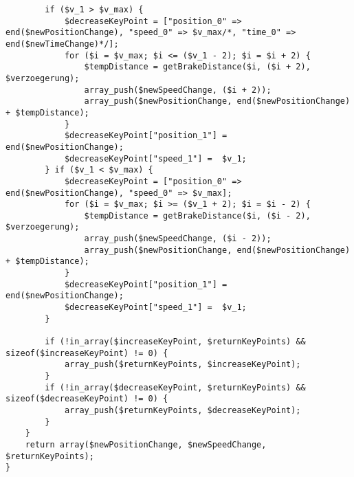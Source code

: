 \begin{lstlisting}
		if ($v_1 > $v_max) {
			$decreaseKeyPoint = ["position_0" => end($newPositionChange), "speed_0" => $v_max/*, "time_0" => end($newTimeChange)*/];
			for ($i = $v_max; $i <= ($v_1 - 2); $i = $i + 2) {
				$tempDistance = getBrakeDistance($i, ($i + 2), $verzoegerung);
				array_push($newSpeedChange, ($i + 2));
				array_push($newPositionChange, end($newPositionChange) + $tempDistance);
			}
			$decreaseKeyPoint["position_1"] =  end($newPositionChange);
			$decreaseKeyPoint["speed_1"] =  $v_1;
		} if ($v_1 < $v_max) {
			$decreaseKeyPoint = ["position_0" => end($newPositionChange), "speed_0" => $v_max];
			for ($i = $v_max; $i >= ($v_1 + 2); $i = $i - 2) {
				$tempDistance = getBrakeDistance($i, ($i - 2), $verzoegerung);
				array_push($newSpeedChange, ($i - 2));
				array_push($newPositionChange, end($newPositionChange) + $tempDistance);
			}
			$decreaseKeyPoint["position_1"] =  end($newPositionChange);
			$decreaseKeyPoint["speed_1"] =  $v_1;
		}

		if (!in_array($increaseKeyPoint, $returnKeyPoints) && sizeof($increaseKeyPoint) != 0) {
			array_push($returnKeyPoints, $increaseKeyPoint);
		}
		if (!in_array($decreaseKeyPoint, $returnKeyPoints) && sizeof($decreaseKeyPoint) != 0) {
			array_push($returnKeyPoints, $decreaseKeyPoint);
		}
	}
	return array($newPositionChange, $newSpeedChange, $returnKeyPoints);
}
\end{lstlisting}









